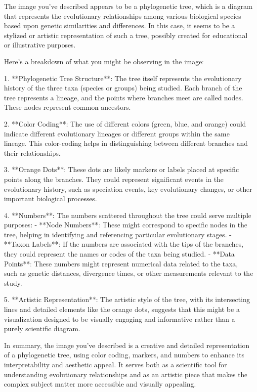 The image you've described appears to be a phylogenetic tree, which is a diagram that represents the evolutionary relationships among various biological species based upon genetic similarities and differences. In this case, it seems to be a stylized or artistic representation of such a tree, possibly created for educational or illustrative purposes.

Here's a breakdown of what you might be observing in the image:

1. **Phylogenetic Tree Structure**: The tree itself represents the evolutionary history of the three taxa (species or groups) being studied. Each branch of the tree represents a lineage, and the points where branches meet are called nodes. These nodes represent common ancestors.

2. **Color Coding**: The use of different colors (green, blue, and orange) could indicate different evolutionary lineages or different groups within the same lineage. This color-coding helps in distinguishing between different branches and their relationships.

3. **Orange Dots**: These dots are likely markers or labels placed at specific points along the branches. They could represent significant events in the evolutionary history, such as speciation events, key evolutionary changes, or other important biological processes.

4. **Numbers**: The numbers scattered throughout the tree could serve multiple purposes:
   - **Node Numbers**: These might correspond to specific nodes in the tree, helping in identifying and referencing particular evolutionary stages.
   - **Taxon Labels**: If the numbers are associated with the tips of the branches, they could represent the names or codes of the taxa being studied.
   - **Data Points**: These numbers might represent numerical data related to the taxa, such as genetic distances, divergence times, or other measurements relevant to the study.

5. **Artistic Representation**: The artistic style of the tree, with its intersecting lines and detailed elements like the orange dots, suggests that this might be a visualization designed to be visually engaging and informative rather than a purely scientific diagram.

In summary, the image you've described is a creative and detailed representation of a phylogenetic tree, using color coding, markers, and numbers to enhance its interpretability and aesthetic appeal. It serves both as a scientific tool for understanding evolutionary relationships and as an artistic piece that makes the complex subject matter more accessible and visually appealing.